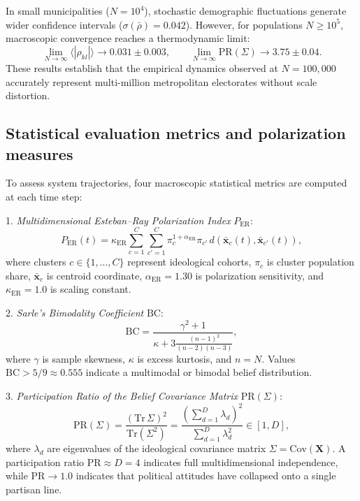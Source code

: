 \documentclass[11pt,a4paper]{article}
\begin{document}
In small municipalities ($N = 10^4$), stochastic demographic fluctuations generate wider confidence intervals ($\sigma(\bar{\rho}) = 0.042$). However, for populations $N \ge 10^5$, macroscopic convergence reaches a thermodynamic limit:
\begin{equation}
    \lim_{N \to \infty} \langle |\rho_{kl}| \rangle \to 0.031 \pm 0.003, \qquad \lim_{N \to \infty} \mathrm{PR}(\Sigma) \to 3.75 \pm 0.04.
    \label{eq:thermodynamic_limit}
\end{equation}
These results establish that the empirical dynamics observed at $N = 100{,}000$ accurately represent multi-million metropolitan electorates without scale distortion.

\subsection{Statistical evaluation metrics and polarization measures}
\label{sssec:statistical_metrics_definitions}
To assess system trajectories, four macroscopic statistical metrics are computed at each time step:

1. \emph{Multidimensional Esteban--Ray Polarization Index} $P_{\mathrm{ER}}$:
\begin{equation}
    P_{\mathrm{ER}}(t) = \kappa_{\mathrm{ER}} \sum_{c=1}^C \sum_{c'=1}^C \pi_c^{1 + \alpha_{\mathrm{ER}}} \pi_{c'} \, d(\bar{\mathbf{x}}_c(t), \bar{\mathbf{x}}_{c'}(t)),
    \label{eq:esteban_ray_index}
\end{equation}
where clusters $c \in \{1, \dots, C\}$ represent ideological cohorts, $\pi_c$ is cluster population share, $\bar{\mathbf{x}}_c$ is centroid coordinate, $\alpha_{\mathrm{ER}} = 1.30$ is polarization sensitivity, and $\kappa_{\mathrm{ER}} = 1.0$ is scaling constant.

2. \emph{Sarle's Bimodality Coefficient} $\mathrm{BC}$:
\begin{equation}
    \mathrm{BC} = \frac{\gamma^2 + 1}{\kappa + 3 \frac{(n-1)^2}{(n-2)(n-3)}},
    \label{eq:sarle_bimodality_coefficient}
\end{equation}
where $\gamma$ is sample skewness, $\kappa$ is excess kurtosis, and $n = N$. Values $\mathrm{BC} > 5/9 \approx 0.555$ indicate a multimodal or bimodal belief distribution.

3. \emph{Participation Ratio of the Belief Covariance Matrix} $\mathrm{PR}(\Sigma)$:
\begin{equation}
    \mathrm{PR}(\Sigma) = \frac{(\mathrm{Tr}\,\Sigma)^2}{\mathrm{Tr}(\Sigma^2)} = \frac{\left(\sum_{d=1}^D \lambda_d\right)^2}{\sum_{d=1}^D \lambda_d^2} \in [1, D],
    \label{eq:participation_ratio}
\end{equation}
where $\lambda_d$ are eigenvalues of the ideological covariance matrix $\Sigma = \mathrm{Cov}(\mathbf{X})$. A participation ratio $\mathrm{PR} \approx D = 4$ indicates full multidimensional independence, while $\mathrm{PR} \to 1.0$ indicates that political attitudes have collapsed onto a single partisan line.
\end{document}

